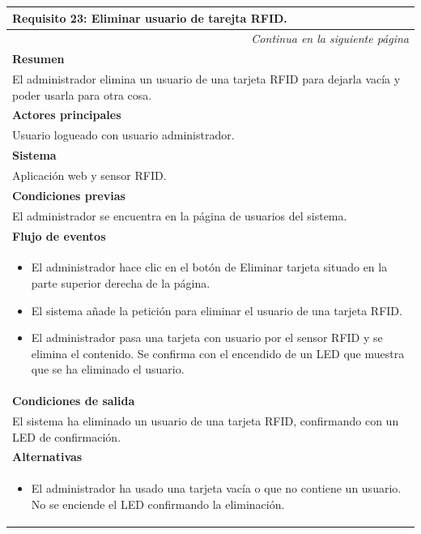 \begin{longtable}{|p{}|}
\hline
  \rowcolor[gray]{.5}
 \color{white}\textbf{Requisito 23: Eliminar usuario de tarejta RFID.} \\
\hline
\endfirsthead
\endhead
\hline \multicolumn{1}{r}{\textit{Continua en la siguiente página}} \\
\endfoot
\endlastfoot
    \rowcolor[gray]{.9}
     \textbf{Resumen} \\
     \hline
     El administrador elimina un usuario de una tarjeta RFID para dejarla vacía y poder usarla para otra cosa. \\
     \hline
     \rowcolor[gray]{.9}
     \textbf{Actores principales} \\
     \hline
     Usuario logueado con usuario administrador. \\
     \hline
     \rowcolor[gray]{.9}
     \textbf{Sistema} \\
     \hline
     Aplicación web y sensor RFID. \\
     \hline
     \rowcolor[gray]{.9}
     \textbf{Condiciones previas} \\
     \hline
     El administrador se encuentra en la página de usuarios del sistema. \\
     \hline
     \rowcolor[gray]{.9}
     \textbf{Flujo de eventos}  \\
     \hline
      \begin{itemize}
         \item El administrador hace clic en el botón de Eliminar tarjeta situado en la parte superior derecha de la página.
         \item El sistema añade la petición para eliminar el usuario de una tarjeta RFID.
         \item El administrador pasa una tarjeta con usuario por el sensor RFID y se elimina el contenido. Se confirma con el encendido de un LED que muestra que se ha eliminado el usuario.
     \end{itemize} \\
     \hline
     \rowcolor[gray]{.9}
     \textbf{Condiciones de salida} \\
     \hline
     El sistema ha eliminado un usuario de una tarjeta RFID, confirmando con un LED de confirmación. \\
     \hline
     \rowcolor[gray]{.9}
     \textbf{Alternativas}  \\
     \hline
      \begin{itemize}
         \item El administrador ha usado una tarjeta vacía o que no contiene un usuario. No se enciende el LED confirmando la eliminación.
     \end{itemize} \\
     \hline
\end{longtable}

